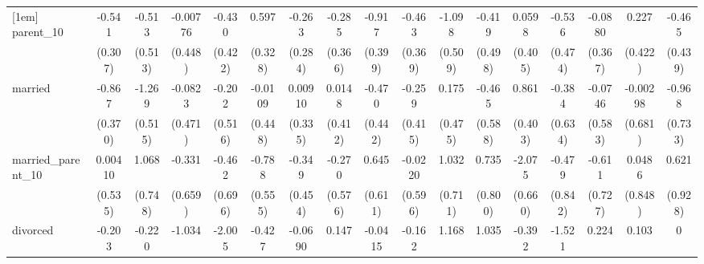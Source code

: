 {\begin{tabular}{l*{16}{c}}
[1em]
parent\_10           &      -0.541         &      -0.513         &    -0.00776         &      -0.430         &       0.597         &      -0.263         &      -0.285         &      -0.917\sym{*}  &      -0.463         &      -1.098\sym{*}  &      -0.419         &      0.0598         &      -0.536         &     -0.0880         &       0.227         &      -0.465         \\
                    &     (0.307)         &     (0.513)         &     (0.448)         &     (0.422)         &     (0.328)         &     (0.284)         &     (0.366)         &     (0.399)         &     (0.369)         &     (0.509)         &     (0.498)         &     (0.405)         &     (0.474)         &     (0.367)         &     (0.422)         &     (0.439)         \\
[1em]
married             &      -0.867\sym{*}  &      -1.269\sym{*}  &     -0.0823         &      -0.202         &     -0.0109         &     0.00910         &      0.0148         &      -0.470         &      -0.259         &       0.175         &      -0.465         &       0.861\sym{*}  &      -0.384         &     -0.0746         &    -0.00298         &      -0.968         \\
                    &     (0.370)         &     (0.515)         &     (0.471)         &     (0.516)         &     (0.448)         &     (0.335)         &     (0.412)         &     (0.442)         &     (0.415)         &     (0.475)         &     (0.588)         &     (0.403)         &     (0.634)         &     (0.583)         &     (0.681)         &     (0.733)         \\
[1em]
married\_parent\_10   &     0.00410         &       1.068         &      -0.331         &      -0.462         &      -0.788         &      -0.349         &      -0.270         &       0.645         &     -0.0220         &       1.032         &       0.735         &      -2.075\sym{**} &      -0.479         &      -0.611         &      0.0486         &       0.621         \\
                    &     (0.535)         &     (0.748)         &     (0.659)         &     (0.696)         &     (0.555)         &     (0.454)         &     (0.576)         &     (0.611)         &     (0.596)         &     (0.711)         &     (0.800)         &     (0.660)         &     (0.842)         &     (0.727)         &     (0.848)         &     (0.928)         \\
[1em]
divorced            &      -0.203         &      -0.220         &      -1.034         &      -2.005         &      -0.427         &     -0.0690         &       0.147         &     -0.0415         &      -0.162         &       1.168         &       1.035         &      -0.392         &      -1.521         &       0.224         &       0.103         &           0         \\

\end{tabular}}
